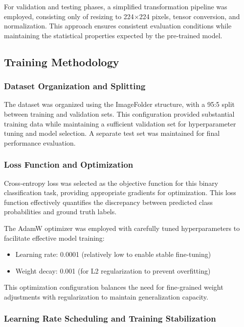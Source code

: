 For validation and testing phases, a simplified transformation pipeline was employed, consisting only of resizing to 224$\times$224 pixels, tensor conversion, and normalization. This approach ensures consistent evaluation conditions while maintaining the statistical properties expected by the pre-trained model.

\subsection{Training Methodology}

\subsubsection{Dataset Organization and Splitting}

The dataset was organized using the ImageFolder structure, with a 95:5 split between training and validation sets. This configuration provided substantial training data while maintaining a sufficient validation set for hyperparameter tuning and model selection. A separate test set was maintained for final performance evaluation.

\subsubsection{Loss Function and Optimization}

Cross-entropy loss was selected as the objective function for this binary classification task, providing appropriate gradients for optimization. This loss function effectively quantifies the discrepancy between predicted class probabilities and ground truth labels.

The AdamW optimizer \citep{loshchilov2017decoupled} was employed with carefully tuned hyperparameters to facilitate effective model training:
\begin{itemize}
    \item Learning rate: 0.0001 (relatively low to enable stable fine-tuning)
    \item Weight decay: 0.001 (for L2 regularization to prevent overfitting)
\end{itemize}

This optimization configuration balances the need for fine-grained weight adjustments with regularization to maintain generalization capacity.

\subsubsection{Learning Rate Scheduling and Training Stabilization}

